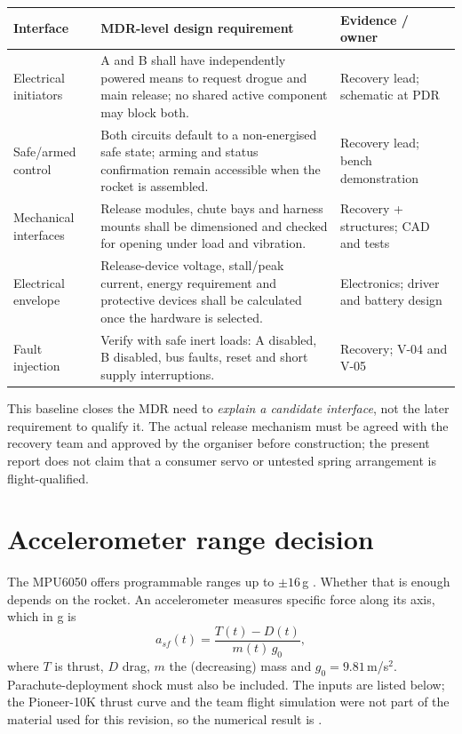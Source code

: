 \small
\begingroup
{}
\begin{tabularx}{\linewidth}{@{}L{34mm}Y L{44mm}@{}}
\toprule{}\textbf{Interface}&\textbf{MDR-level design requirement}&\textbf{Evidence / owner}\\\midrule
Electrical initiators & A and B shall have independently powered means to request drogue and main release; no shared active component may block both. & Recovery lead; schematic at PDR\\
Safe/armed control & Both circuits default to a non-energised safe state; arming and status confirmation remain accessible when the rocket is assembled. & Recovery lead; bench demonstration\\
Mechanical interfaces & Release modules, chute bays and harness mounts shall be dimensioned and checked for opening under load and vibration. & Recovery + structures; CAD and tests\\
Electrical envelope & Release-device voltage, stall/peak current, energy requirement and protective devices shall be calculated once the hardware is selected. & Electronics; driver and battery design\\
Fault injection & Verify with safe inert loads: A disabled, B disabled, bus faults, reset and short supply interruptions. & Recovery; V-04 and V-05\\
\bottomrule
\end{tabularx}
\endgroup %
\normalsize

This baseline closes the MDR need to \emph{explain a candidate interface}, not the later requirement to qualify it. The actual release mechanism must be agreed with the recovery team and approved by the organiser before construction; the present report does not claim that a consumer servo or untested spring arrangement is flight-qualified.

\section{Accelerometer range decision}
\label{sec:accel}
The MPU6050 offers programmable ranges up to $\pm16$\,g \cite{mpu6050ds}. Whether that is enough depends on the rocket. An accelerometer measures specific force along its axis, which in g is
\begin{equation}
a_{sf}(t)=\frac{T(t)-D(t)}{m(t)\,g_0},
\end{equation}
where $T$ is thrust, $D$ drag, $m$ the (decreasing) mass and $g_0=9.81$\,m/s$^2$. Parachute-deployment shock must also be included. The inputs are listed below; the Pioneer-10K thrust curve and the team flight simulation were not part of the material used for this revision, so the numerical result is .

